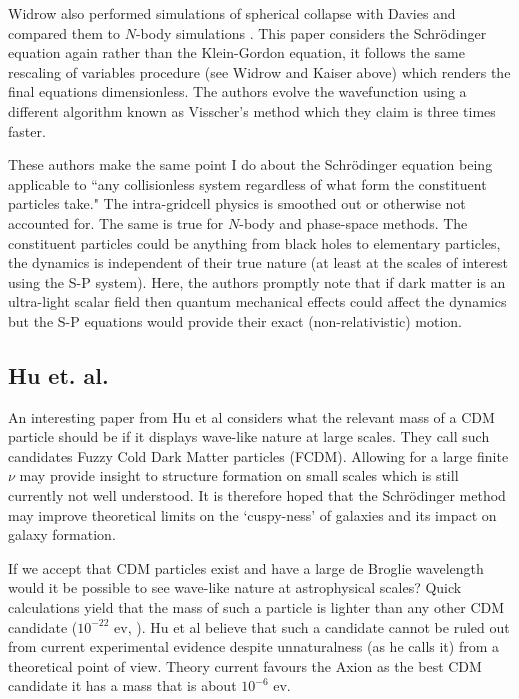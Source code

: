 Widrow also performed simulations of spherical collapse with Davies and compared them to $N$-body simulations \citep{bib_wd}. This paper considers the Schr\"odinger equation again rather than the Klein-Gordon equation, it follows the same rescaling of variables procedure (see Widrow and Kaiser above) which renders the final equations dimensionless. The authors evolve the wavefunction using a different algorithm known as Visscher's method which they claim is three times faster.

These authors make the same point I do about the Schr\"odinger equation being applicable to ``any collisionless system regardless of what form the constituent particles take." The intra-gridcell physics is smoothed out or otherwise not accounted for. The same is true for $N$-body and phase-space methods. The constituent particles could be anything from black holes to elementary particles, the dynamics is independent of their true nature (at least at the scales of interest using the S-P system). Here, the authors promptly note that if dark matter is an ultra-light scalar field then quantum mechanical effects could affect the dynamics but the S-P equations would provide their exact (non-relativistic) motion.

\subsection{Hu et. al.}
\label{whu}
An interesting paper from Hu et al \citep{bib_whu} considers what the relevant mass of a CDM particle should be if it displays wave-like nature at large scales. They call such candidates Fuzzy Cold Dark Matter particles (FCDM). Allowing for a large finite $\nu$ may provide insight to structure formation on small scales which is still currently not well understood. It is therefore hoped that the Schr\"odinger method may improve theoretical limits on the `cuspy-ness' of galaxies and its impact on galaxy formation.

If we accept that CDM particles exist and have a large de Broglie wavelength would it be possible to see wave-like nature at astrophysical scales? Quick calculations yield that the mass of such a particle is lighter than any other CDM candidate ($10^{-22}$ ev, \citep{bib_whu}). Hu et al believe that such a candidate cannot be ruled out from current experimental evidence despite unnaturalness (as he calls it) from a theoretical point of view. Theory current favours the Axion as the best CDM candidate it has a mass that is about $10^{-6}$ ev.

